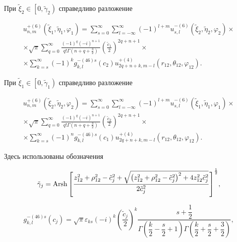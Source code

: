 \begin{theorem}
При ${\tilde \xi _2} \in \left[ {0,{{\tilde \gamma }_2}} \right)$ справедливо разложение

\begin{multline}\label{eq:1:33}
u_{n,m}^{ + (6)}\left( {{{\tilde \xi }_1},{{\tilde \eta }_1},{\varphi _1}} \right) = \sum\limits_{s = 0}^\infty  {\sum\limits_{l =  - \infty }^\infty  {{{( - 1)}^{l + m}}} } u_{s,l}^{ - (6)}\left( {{{\tilde \xi }_2},{{\tilde \eta }_2},{\varphi _2}} \right) \times \\
\times \sqrt \pi  \sum\limits_{q = 0}^\infty  {\frac{{{{( - 1)}^q}{{( - i)}^{n + 1}}}}{{q!\Gamma \left( {n + q + \frac{3}{2}} \right)}}} {\left( {\frac{{{{\tilde c}_1}}}{2}} \right)^{2q + n + 1}} \times \\
\times \sum\limits_{k = s}^\infty  {{{( - 1)}^k}} g_{k,l}^{ - (46)s}({c_2})u_{2q + n + k,m - l}^{ + (4)}\left( {{r_{12}},{\theta _{12}},{\varphi _{12}}} \right).
\end{multline}

При ${\tilde \xi _1} \in \left[ {0,{{\tilde \gamma }_1}} \right)$ справедливо разложение

\begin{multline}\label{eq:1:34}
u_{n,m}^{ + (6)}\left( {{{\tilde \xi }_2},{{\tilde \eta }_2},{\varphi _2}} \right) = \sum\limits_{s = 0}^\infty  {\sum\limits_{l =  - \infty }^\infty  {{{( - 1)}^{l + m}}} } u_{s,l}^{ - (6)}\left( {{{\tilde \xi }_1},{{\tilde \eta }_1},{\varphi _1}} \right) \times \\
\times \sqrt \pi  \sum\limits_{q = 0}^\infty  {\frac{{{{( - 1)}^q}{{( - i)}^{n + 1}}}}{{q!\Gamma \left( {n + q + \frac{3}{2}} \right)}}} {\left( {\frac{{{{\tilde c}_2}}}{2}} \right)^{2q + n + 1}} \times \\
\times \sum\limits_{k = s}^\infty  {{{( - 1)}^n}} g_{k,l}^{ - (46)s}({c_1})u_{2q + n + k,m - l}^{ + (4)}\left( {{r_{12}},{\theta _{12}},{\varphi _{12}}} \right).
\end{multline}

Здесь использованы обозначения

\begin{equation}\label{eq:1:35}
{\tilde \gamma _j} = {\rm{Arsh}}{\mkern 1mu} {\kern 1pt} {\left[ {\frac{{z_{12}^2 + \rho _{12}^2 - \tilde c_j^2 + \sqrt {\left( {z_{12}^2 + \rho _{12}^2 - \tilde c_j^2} \right)^2 + 4z_{12}^2\tilde c_j^2} }}{{2\tilde c_j^2}}} \right]^{\frac{1}{2}}},
\end{equation}

\begin{equation}\label{eq:1:36}
g_{k,l}^{ - (46)s}({c_j}) = \sqrt \pi  {\varepsilon _{ks}}{( - i)^k}{\left( {\dfrac{{{{\tilde c}_j}}}{2}} \right)^k}\dfrac{{s + \dfrac{1}{2}}}{{\Gamma \left( {\dfrac{k}{2} - \dfrac{s}{2} + 1} \right)\Gamma \left( {\dfrac{k}{2} + \dfrac{s}{2} + \dfrac{3}{2}} \right)}},
\end{equation}

\end{theorem}

